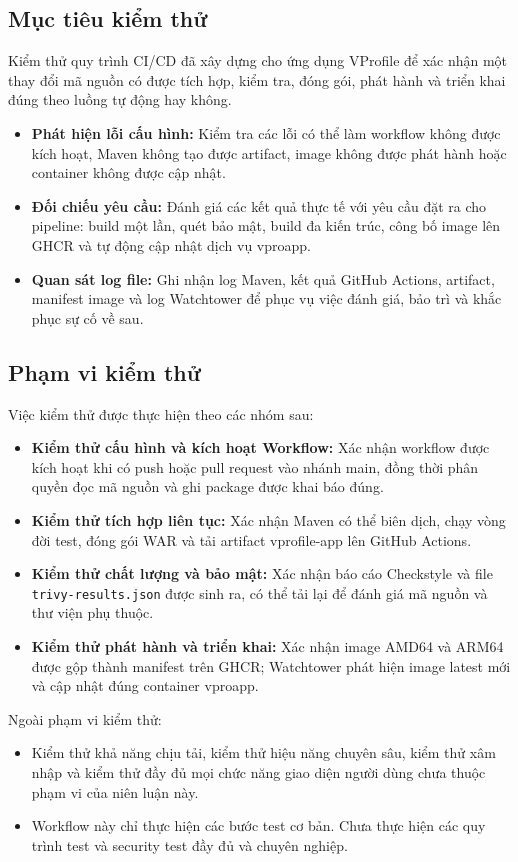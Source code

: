 \documentclass[12pt,a4paper,oneside]{extreport}
\begin{document}
\subsection{Mục tiêu kiểm thử}
Kiểm thử quy trình CI/CD đã xây dựng cho ứng dụng VProfile để xác nhận một thay
đổi mã nguồn có được tích hợp, kiểm tra, đóng gói, phát hành và triển khai đúng
theo luồng tự động hay không.
\begin{itemize}
  \item \textbf{Phát hiện lỗi cấu hình:} Kiểm tra các lỗi có thể làm workflow
  không được kích hoạt, Maven không tạo được artifact, image không được phát
  hành hoặc container không được cập nhật.
  \item \textbf{Đối chiếu yêu cầu:} Đánh giá các kết quả thực tế với yêu cầu đặt
  ra cho pipeline: build một lần, quét bảo mật, build đa kiến trúc, công bố
  image lên GHCR và tự động cập nhật dịch vụ vproapp.
  \item \textbf{Quan sát log file:} Ghi nhận log Maven, kết quả GitHub Actions,
  artifact, manifest image và log Watchtower để phục vụ việc đánh giá, bảo trì
  và khắc phục sự cố về sau.
\end{itemize}

\subsection{Phạm vi kiểm thử}
Việc kiểm thử được thực hiện theo các nhóm sau:
\begin{itemize}
  \item \textbf{Kiểm thử cấu hình và kích hoạt Workflow:} Xác nhận workflow được
  kích hoạt khi có push hoặc pull request vào nhánh main, đồng thời phân quyền
  đọc mã nguồn và ghi package được khai báo đúng.
  \item \textbf{Kiểm thử tích hợp liên tục:} Xác nhận Maven có thể biên dịch,
  chạy vòng đời test, đóng gói WAR và tải artifact vprofile-app lên GitHub
  Actions.
  \item \textbf{Kiểm thử chất lượng và bảo mật:} Xác nhận báo cáo Checkstyle và
  file \texttt{trivy-results.json} được sinh ra, có thể tải lại để đánh giá mã
  nguồn và thư viện phụ thuộc.
  \item \textbf{Kiểm thử phát hành và triển khai:} Xác nhận image AMD64 và ARM64
  được gộp thành manifest trên GHCR; Watchtower phát hiện image latest mới và
  cập nhật đúng container vproapp.
\end{itemize}

Ngoài phạm vi kiểm thử:
\begin{itemize}
  \item Kiểm thử khả năng chịu tải, kiểm thử hiệu năng chuyên sâu, kiểm thử xâm
  nhập và kiểm thử đầy đủ mọi chức năng giao diện người dùng chưa thuộc phạm vi
  của niên luận này.
  \item Workflow này chỉ thực hiện các bước test cơ bản. Chưa thực hiện các quy
  trình test và security test đầy đủ và chuyên nghiệp.
\end{itemize}
\end{document}
